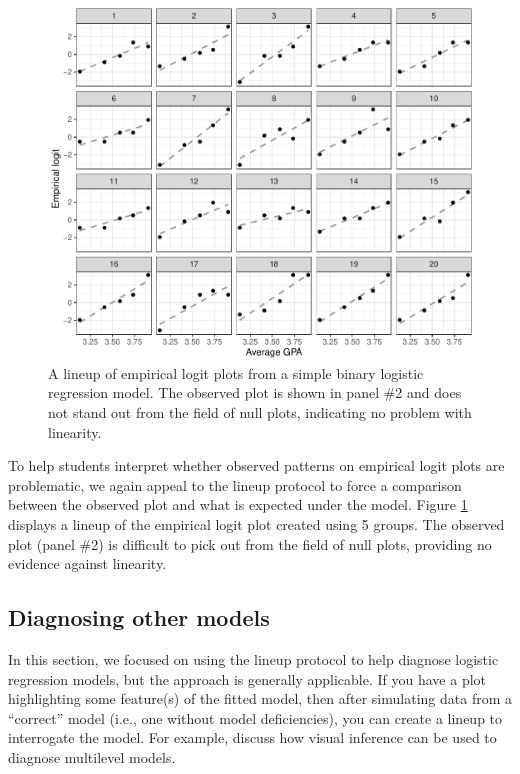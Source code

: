 \documentclass[12pt]{article}
\begin{document}
\begin{figure}
\centering
\includegraphics{vizinf-paper-blind_files/figure-latex/unnamed-chunk-8-1.pdf}
\caption{\label{fig:emplogitlineup} A lineup of empirical logit plots
from a simple binary logistic regression model. The observed plot is
shown in panel \#2 and does not stand out from the field of null plots,
indicating no problem with linearity.}
\end{figure}

To help students interpret whether observed patterns on empirical logit
plots are problematic, we again appeal to the lineup protocol to force a
comparison between the observed plot and what is expected under the
model. Figure \ref{fig:emplogitlineup} displays a lineup of the
empirical logit plot created using 5 groups. The observed plot (panel
\#2) is difficult to pick out from the field of null plots, providing no
evidence against linearity.

\hypertarget{diagnosing-other-models}{%
\subsection{Diagnosing other models}\label{diagnosing-other-models}}

In this section, we focused on using the lineup protocol to help
diagnose logistic regression models, but the approach is generally
applicable. If you have a plot highlighting some feature(s) of the
fitted model, then after simulating data from a ``correct'' model (i.e.,
one without model deficiencies), you can create a lineup to interrogate
the model. For example, \cite{Loy2017-fo} discuss how visual inference
can be used to diagnose multilevel models.
\end{document}
